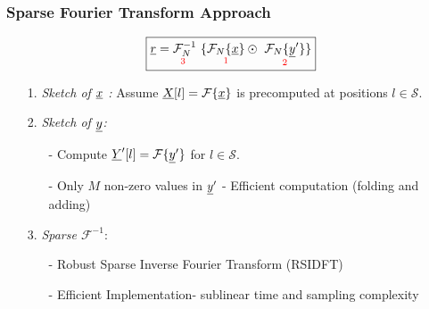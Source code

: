 \begin{frame}\frametitle{Sparse Fourier Transform Approach}
	\begin{figure}[t]
		\centering
		\scalebox{0.27}{}
	\end{figure}
\vspace{-0.2cm}
	 	\begin{block}{}
	 		\begin{equation}\label{eqn:Rxy_fourier} \nonumber
	 		\boxed{\underline{r} = \underset{\text{\color{red} 3 } } {\mathcal{F}_{N}^{-1}} \ \{ \underset{\text{ \color{red} 1 } }{  \mathcal{F}_{N}\{\underline{x}\}}  \odot \ \underset{\text{ \color{red} 2 } }{ \mathcal{F}_{N}\{\underline{y}'\}}  \} }
	 		\end{equation} 
	 		
	 		\begin{itemize} 
	 			\item[\color{red} 1.] \textit{\color{blue} Sketch of $\underline{x}$ : }  Assume $ \underline{X}[l] = \mathcal{F}\{\underline{x}\}$ is precomputed at positions $l \in \mathcal{S}$.
	 			
	 			\item[\color{red} 2.] \textit{\color{blue} Sketch of $\underline{y}$:}
	 			\begin{itemize} 
	 				\item[-] Compute $ \underline{Y}'[l] = \mathcal{F}\{\underline{y}'\}$ for $l \in \mathcal{S}$.
	 				\item[-] Only $M$ non-zero values in $\underline{y}'$ - Efficient computation (folding and adding)
	 			\end{itemize}
	 			
	 			\item[\color{red} 3.] \textit{\color{blue} Sparse $\mathcal{F}^{-1}$}:
	 			\begin{itemize}  
	 				\item[-] Robust Sparse Inverse Fourier Transform (RSIDFT)
	 				\item[-] Efficient Implementation- {\color{blue} sublinear} time and sampling complexity
	 			\end{itemize}
	 		\end{itemize}
	 	\end{block}
\end{frame}


